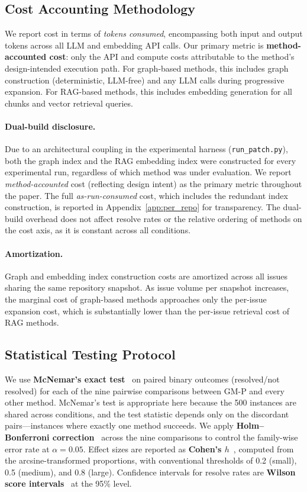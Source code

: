 \subsection{Cost Accounting Methodology}

We report cost in terms of \emph{tokens consumed}, encompassing both input and output tokens across all LLM and embedding API calls. Our primary metric is \textbf{method-accounted cost}: only the API and compute costs attributable to the method's design-intended execution path. For graph-based methods, this includes graph construction (deterministic, LLM-free) and any LLM calls during progressive expansion. For RAG-based methods, this includes embedding generation for all chunks and vector retrieval queries.

\paragraph{Dual-build disclosure.} Due to an architectural coupling in the experimental harness (\texttt{run\_patch.py}), both the graph index and the RAG embedding index were constructed for every experimental run, regardless of which method was under evaluation. We report \emph{method-accounted} cost (reflecting design intent) as the primary metric throughout the paper. The full \emph{as-run-consumed} cost, which includes the redundant index construction, is reported in Appendix~\ref{app:per_repo} for transparency. The dual-build overhead does not affect resolve rates or the relative ordering of methods on the cost axis, as it is constant across all conditions.

\paragraph{Amortization.} Graph and embedding index construction costs are amortized across all issues sharing the same repository snapshot. As issue volume per snapshot increases, the marginal cost of graph-based methods approaches only the per-issue expansion cost, which is substantially lower than the per-issue retrieval cost of RAG methods.

\subsection{Statistical Testing Protocol}
\label{sec:stats}

We use \textbf{McNemar's exact test}~\cite{mcnemar1947note} on paired binary outcomes (resolved/not resolved) for each of the nine pairwise comparisons between GM-P and every other method. McNemar's test is appropriate here because the 500 instances are shared across conditions, and the test statistic depends only on the discordant pairs---instances where exactly one method succeeds. We apply \textbf{Holm--Bonferroni correction}~\cite{holm1979simple} across the nine comparisons to control the family-wise error rate at $\alpha = 0.05$. Effect sizes are reported as \textbf{Cohen's $h$}~\cite{cohen1988statistical}, computed from the arcsine-transformed proportions, with conventional thresholds of 0.2 (small), 0.5 (medium), and 0.8 (large). Confidence intervals for resolve rates are \textbf{Wilson score intervals}~\cite{wilson1927probable} at the 95\% level.

